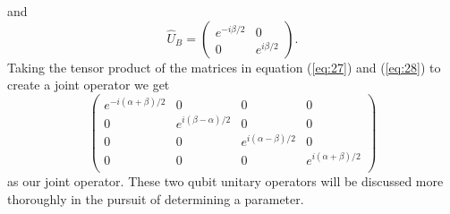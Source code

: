 \documentclass[twocolumn]{article}
\begin{document}
and
\begin{equation} \label{eq:28}
\hat{U}_B=
\begin{pmatrix}
e^{-i\beta/2} & 0 \\
0 & e^{i\beta/2}
\end{pmatrix}.
\end{equation}
Taking the tensor product of the matrices in equation (\ref{eq:27}) and (\ref{eq:28}) to create a joint operator we get
\begin{equation} \label{eq:29}
\left(\begin{array}{cccc}
e^{-i(\alpha+\beta)/2} & 0 & 0 & 0 \\
0 & e^{i(\beta-\alpha)/2} & 0 & 0 \\
0 & 0 & e^{i(\alpha-\beta)/2} & 0 \\
0 & 0 & 0 & e^{i(\alpha+\beta)/2} \\
\end{array}\right)
\end{equation}
as our joint operator. These two qubit unitary operators will be discussed more thoroughly in the pursuit of determining a parameter.
\end{document}
